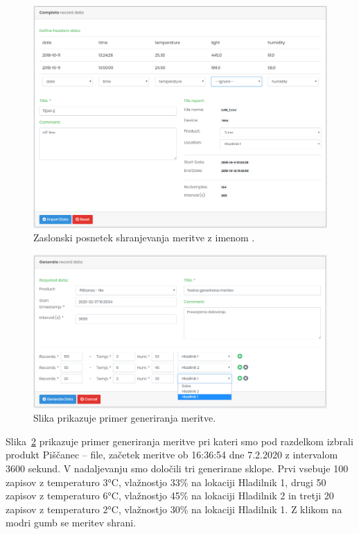 \documentclass[a4paper, 12pt]{book}
\begin{document}
\begin{figure}[h]
\begin{center}
\includegraphics[width=\textwidth]{slike/import_data_tida.png}
\end{center}
\caption{Zaslonski posnetek shranjevanja meritve z imenom .}
\label{ss-import-data}
\end{figure}


\begin{figure}[h]
\begin{center}
\includegraphics[width=\textwidth]{slike/generate_data.png}
\end{center}
\caption{Slika prikazuje primer generiranja meritve.}
\label{ss-generate-data}
\end{figure}

Slika~\ref{ss-generate-data} prikazuje primer generiranja meritve pri kateri smo pod razdelkom  izbrali produkt Piščanec – file, začetek meritve ob 16:36:54 dne 7.2.2020 z intervalom 3600 sekund. V nadaljevanju smo določili tri generirane sklope. Prvi vsebuje 100 zapisov z temperaturo 3°C, vlažnostjo 33\% na lokaciji Hladilnik 1, drugi 50 zapisov z temperaturo 6°C, vlažnostjo 45\% na lokaciji Hladilnik 2 in tretji 20 zapisov z temperaturo 2°C, vlažnostjo 30\% na lokaciji Hladilnik 1. Z klikom na modri gumb  se meritev shrani.
\end{document}
